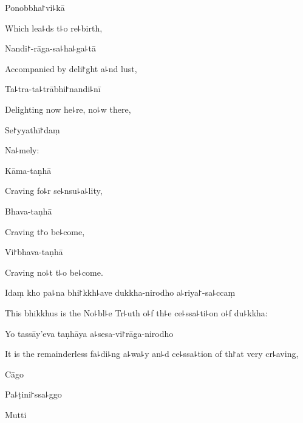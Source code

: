 Ponobbha꜓vi꜕kā

\begin{english}
  Which lea꜕ds t꜕o re꜕birth,
\end{english}

Nandi꜓-rāga-sa꜕ha꜕ga꜕tā

\begin{english}
  Accompanied by deli꜓ght a꜕nd lust,
\end{english}

Ta꜕tra-ta꜕trābhi꜓nandi꜕nī

\begin{english}
  Delighting now he꜕re, no꜕w there,
\end{english}

Se꜓yyathī꜓daṃ

\begin{english}
  Na꜕mely:
\end{english}

Kāma-taṇhā

\begin{english}
  Craving fo꜕r se꜕nsu꜕a꜕lity,
\end{english}

Bhava-taṇhā

\begin{english}
  Craving t꜓o be꜕come,
\end{english}

Vi꜓bhava-taṇhā

\begin{english}
  Craving no꜕t t꜕o be꜕come.
\end{english}

Idaṃ kho pa꜕na bhi꜓kkh꜕ave dukkha-nirodho a꜕riya꜓-sa꜕ccaṃ

\begin{english}
  This bhikkhus is the No꜕bl꜕e Tr꜕uth o꜕f th꜕e ce꜕ssa꜕ti꜕on o꜕f du꜕kkha:
\end{english}

Yo tassāy'eva taṇhāya a꜕sesa-vi꜓rāga-nirodho

\begin{english}
  It is the remainderless fa꜕di꜕ng a꜕wa꜕y an꜕d ce꜕ssa꜕tion of th꜓at very cr꜕aving,
\end{english}

Cāgo


Pa꜕ṭini꜓ssa꜕ggo


Mutti


